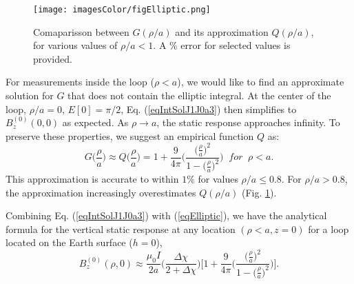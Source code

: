\documentclass[journal]{IEEEtran}  %
\begin{document}
\begin{figure}[!t]
\centering
\texttt{[image: imagesColor/figElliptic.png]}
\caption{Comaparisson between $G(\rho /a)$  and its
approximation $Q(\rho /a)$, for various values of $\rho /a < 1$. A
\% error for selected values is provided.} \label{figElliptic}
\end{figure}
%

For measurements inside the loop ($\rho <a$), we would like to find
an approximate solution for $G$ that does not contain the elliptic
integral. At the center of the loop, $\rho /a =0$, $E[0]= \pi /2$,
Eq. (\ref{eqIntSolJ1J0a3}) then simplifies to $B_z^{(0)} (0,0)$ as
expected. As $\rho \rightarrow a$, the static response approaches
infinity. To preserve these properties, we suggest an empirical
function $Q$ as:
\begin{equation}
\label{eqElliptic} G \Big ( \frac{\rho}{a} \Big ) \approx Q \Big (
\frac{\rho}{a} \Big ) = 1 + \frac{9}{4\pi} \Bigg ( \frac{\big(
\frac{\rho}{a} \big )^2}{1- \big( \frac{\rho}{a} \big )^2} \Bigg )
\; \; for \; \; \rho < a.
\end{equation}
This approximation  is accurate to within $1\% $ for values $\rho /
a \leq 0.8$. For $\rho /a > 0.8$, the approximation increasingly
overestimates $Q (\rho /a)$ (Fig. \ref{figElliptic}).

Combining Eq. (\ref{eqIntSolJ1J0a3}) with (\ref{eqElliptic}), we
have the analytical formula for the vertical static response at any
location $(\rho < a,z=0)$ for a loop located on the Earth surface
($h=0$),
\begin{equation}
B^{(0)}_z(\rho,0) \approx \frac{\mu_0 I}{2a}  \Bigg ( \frac{\Delta
\chi}{2+\Delta \chi} \Bigg ) \Bigg [ 1 + \frac{9}{4\pi} \Bigg (
\frac{\big( \frac{\rho}{a} \big )^2}{1- \big( \frac{\rho}{a} \big
)^2} \Bigg ) \Bigg ]. \label{eqStaticLoopBz}
\end{equation}
\\\\
\end{document}
